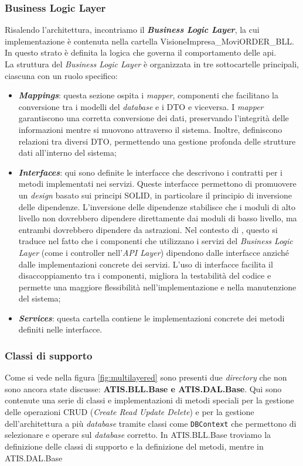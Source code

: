 \subsubsection{Business Logic Layer}
Risalendo l'architettura, incontriamo il \textbf{\textit{Business Logic Layer}}, la cui implementazione è contenuta 
nella cartella VisioneImpresa\_MoviORDER\_BLL. In questo strato è definita la logica che governa il comportamento 
delle \gls{api}.\\
La struttura del \textit{Business Logic Layer} è organizzata in tre sottocartelle principali, ciascuna con un ruolo specifico:
\begin{itemize}
    \item \textbf{\textit{Mappings}}: questa sezione ospita i \textit{mapper}, componenti che facilitano la conversione 
          tra i modelli del \textit{database} e i DTO e viceversa. I \textit{mapper} garantiscono una corretta conversione 
          dei dati, preservando l'integrità delle informazioni mentre si muovono attraverso il sistema. Inoltre, definiscono 
          relazioni tra diversi DTO, permettendo una gestione profonda delle strutture dati all'interno del sistema;
    \item \textbf{\textit{Interfaces}}: qui sono definite le interfacce che descrivono i contratti per i metodi implementati 
          nei servizi. Queste interfacce permettono di promuovere un \textit{design} basato sui principi SOLID, 
          in particolare il principio di inversione delle dipendenze. L'inversione delle dipendenze stabilisce che i moduli 
          di alto livello non dovrebbero dipendere direttamente dai moduli di basso livello, ma entrambi dovrebbero dipendere 
          da astrazioni. Nel contesto di {\movi}, questo si traduce nel fatto che i componenti che utilizzano i servizi del 
          \textit{Business Logic Layer} (come i controller nell'\textit{API Layer}) dipendono dalle interfacce anziché 
          dalle implementazioni concrete dei servizi. L'uso di interfacce facilita il disaccoppiamento 
          tra i componenti, migliora la testabilità del codice e permette una maggiore flessibilità nell'implementazione e 
          nella manutenzione del sistema;
    \item \textbf{\textit{Services}}: questa cartella contiene le implementazioni concrete dei metodi definiti nelle interfacce. 
\end{itemize}
\subsubsection{Classi di supporto}
Come si vede nella figura \ref{fig:multilayered} sono presenti due \textit{directory} che non sono ancora state discusse: 
\textbf{ATIS.BLL.Base e ATIS.DAL.Base}. Qui sono contenute una serie di classi e implementazioni di metodi speciali 
per la gestione delle operazioni CRUD (\textit{Create Read Update Delete}) e per la gestione dell'architettura a più 
\textit{database} tramite classi come \texttt{DBContext} che permettono di selezionare e operare sul \textit{database} 
corretto. In ATIS.BLL.Base troviamo la definizione delle classi di supporto e la definizione del metodi, mentre in 
ATIS.DAL.Base 

